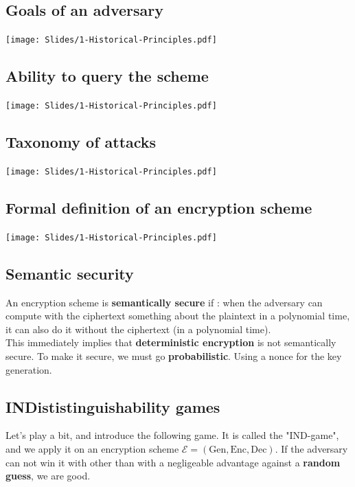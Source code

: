\documentclass[a4paper, 12pt]{book}
\begin{document}
\subsection{Goals of an adversary}
\texttt{[image: Slides/1-Historical-Principles.pdf]} 

\subsection{Ability to query the scheme}
\texttt{[image: Slides/1-Historical-Principles.pdf]} 

\subsection{Taxonomy of attacks}
\texttt{[image: Slides/1-Historical-Principles.pdf]}

\subsection{Formal definition of an encryption scheme}
\texttt{[image: Slides/1-Historical-Principles.pdf]} 

\subsection{Semantic security}
An encryption scheme is \textbf{semantically secure} if : when the adversary can compute  with the ciphertext something about the plaintext in a polynomial time, it can also do it without the ciphertext (in a polynomial time). \\

This immediately implies that \textbf{deterministic encryption} is not semantically secure. To make it secure, we must go \textbf{probabilistic}. Using a nonce for the key generation.


\subsection{INDististinguishability games}
Let's play a bit, and introduce the following game. It is called the "IND-game", and we apply it on an encryption scheme $\mathcal{E} = (\mathrm{Gen}, \mathrm{Enc}, \mathrm{Dec})$. If the adversary can not win it with other than with a negligeable advantage against a \textbf{random guess}, we are good. \\
\end{document}
